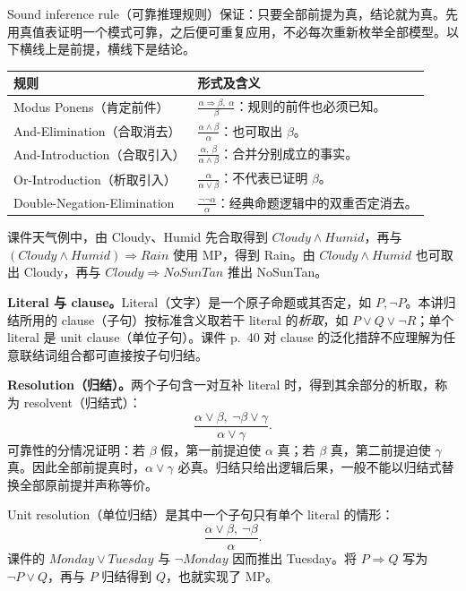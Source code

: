
Sound inference rule（可靠推理规则）保证：只要全部前提为真，结论就为真。先用真值表证明一个模式可靠，之后便可重复应用，不必每次重新枚举全部模型。以下横线上是前提，横线下是结论。

\begin{center}
\renewcommand{\arraystretch}{1.65}
\begin{tabularx}{\textwidth}{@{}lX@{}}
\toprule
规则 & 形式及含义 \\
\midrule
Modus Ponens（肯定前件） & $\displaystyle\frac{\alpha\Rightarrow\beta,\ \alpha}{\beta}$：规则的前件也必须已知。 \\
And-Elimination（合取消去） & $\displaystyle\frac{\alpha\land\beta}{\alpha}$：也可取出 $\beta$。 \\
And-Introduction（合取引入） & $\displaystyle\frac{\alpha,\ \beta}{\alpha\land\beta}$：合并分别成立的事实。 \\
Or-Introduction（析取引入） & $\displaystyle\frac{\alpha}{\alpha\lor\beta}$：不代表已证明 $\beta$。 \\
Double-Negation-Elimination & $\displaystyle\frac{\neg\neg\alpha}{\alpha}$：经典命题逻辑中的双重否定消去。 \\
\bottomrule
\end{tabularx}
\end{center}

课件天气例中，由 Cloudy、Humid 先合取得到 $Cloudy\land Humid$，再与 $(Cloudy\land Humid)\Rightarrow Rain$ 使用 MP，得到 Rain。由 $Cloudy\land Humid$ 也可取出 Cloudy，再与 $Cloudy\Rightarrow NoSunTan$ 推出 NoSunTan。

\textbf{Literal 与 clause。}Literal（文字）是一个原子命题或其否定，如 $P,\neg P$。本讲归结所用的 clause（子句）按标准含义取若干 literal 的\emph{析取}，如 $P\lor Q\lor\neg R$；单个 literal 是 unit clause（单位子句）。课件 p.~40 对 clause 的泛化措辞不应理解为任意联结词组合都可直接按子句归结。

\textbf{Resolution（归结）。}两个子句含一对互补 literal 时，得到其余部分的析取，称为 resolvent（归结式）：
\[
 \boxed{\frac{\alpha\lor\beta,\ \neg\beta\lor\gamma}{\alpha\lor\gamma}}.
\]
可靠性的分情况证明：若 $\beta$ 假，第一前提迫使 $\alpha$ 真；若 $\beta$ 真，第二前提迫使 $\gamma$ 真。因此全部前提真时，$\alpha\lor\gamma$ 必真。归结只给出逻辑后果，一般不能以归结式替换全部原前提并声称等价。

Unit resolution（单位归结）是其中一个子句只有单个 literal 的情形：
\[
 \frac{\alpha\lor\beta,\ \neg\beta}{\alpha}.
\]
课件的 $Monday\lor Tuesday$ 与 $\neg Monday$ 因而推出 Tuesday。将 $P\Rightarrow Q$ 写为 $\neg P\lor Q$，再与 $P$ 归结得到 $Q$，也就实现了 MP。

